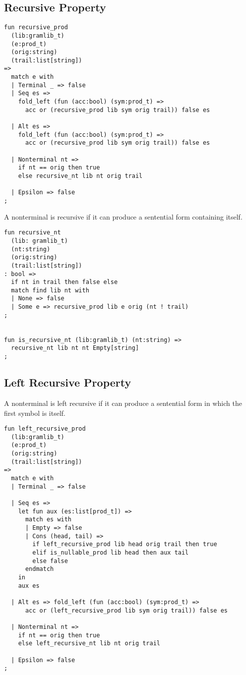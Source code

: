 \documentclass[oneside]{book}
\begin{document}
\subsection{Recursive Property}
\begin{verbatim}
fun recursive_prod 
  (lib:gramlib_t) 
  (e:prod_t) 
  (orig:string) 
  (trail:list[string]) 
=>
  match e with
  | Terminal _ => false
  | Seq es => 
    fold_left (fun (acc:bool) (sym:prod_t) => 
      acc or (recursive_prod lib sym orig trail)) false es

  | Alt es => 
    fold_left (fun (acc:bool) (sym:prod_t) => 
      acc or (recursive_prod lib sym orig trail)) false es

  | Nonterminal nt => 
    if nt == orig then true 
    else recursive_nt lib nt orig trail

  | Epsilon => false
;
\end{verbatim}

A nonterminal is recursive if it can produce a sentential
form containing itself.

\begin{verbatim}
fun recursive_nt
  (lib: gramlib_t) 
  (nt:string) 
  (orig:string) 
  (trail:list[string]) 
: bool =>
  if nt in trail then false else
  match find lib nt with
  | None => false
  | Some e => recursive_prod lib e orig (nt ! trail)
;


fun is_recursive_nt (lib:gramlib_t) (nt:string) =>
  recursive_nt lib nt nt Empty[string]
;
\end{verbatim}

\subsection{Left Recursive Property}
A nonterminal is left recursive if it can produce a sentential
form in which the first symbol is itself.

\begin{verbatim}
fun left_recursive_prod 
  (lib:gramlib_t) 
  (e:prod_t) 
  (orig:string) 
  (trail:list[string]) 
=>
  match e with
  | Terminal _ => false

  | Seq es =>
    let fun aux (es:list[prod_t]) =>
      match es with
      | Empty => false
      | Cons (head, tail) => 
        if left_recursive_prod lib head orig trail then true
        elif is_nullable_prod lib head then aux tail
        else false
      endmatch
    in
    aux es

  | Alt es => fold_left (fun (acc:bool) (sym:prod_t) => 
      acc or (left_recursive_prod lib sym orig trail)) false es

  | Nonterminal nt => 
    if nt == orig then true 
    else left_recursive_nt lib nt orig trail

  | Epsilon => false 
;
\end{verbatim}
\end{document}
